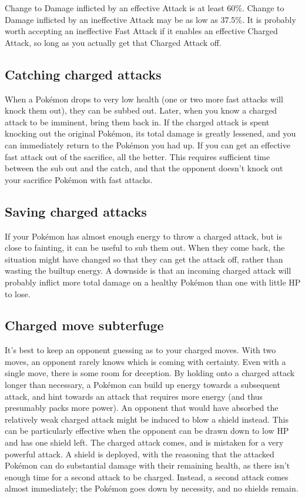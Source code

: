 Change to Damage inflicted by an effective Attack is at least 60\%.
Change to Damage inflicted by an ineffective Attack may be as
 low as 37.5\%.
It is probably worth accepting an ineffective Fast Attack if it
 enables an effective Charged Attack, so long as you actually
 get that Charged Attack off.

\subsection{Catching charged attacks}
When a Pokémon drops to very low health (one or two more fast attacks will knock
 them out), they can be subbed out.
Later, when you know a charged attack to be imminent, bring them back in.
If the charged attack is spent knocking out the original Pokémon, its total
 damage is greatly lessened, and you can immediately return to the Pokémon
 you had up.
If you can get an effective fast attack out of the sacrifice, all the better.
This requires sufficient time between the sub out and the catch, and that the
 opponent doesn't knock out your sacrifice Pokémon with fast attacks.

\subsection{Saving charged attacks}
If your Pokémon has almost enough energy to throw a charged attack, but is close to fainting, it can be useful to sub them out.
When they come back, the situation might have changed so that they can get the attack off,
 rather than wasting the builtup energy.
A downside is that an incoming charged attack will probably inflict more total
 damage on a healthy Pokémon than one with little HP to lose.

\subsection{Charged move subterfuge}
It's best to keep an opponent guessing as to your charged moves.
With two moves, an opponent rarely knows which is coming with certainty.
Even with a single move, there is some room for deception.
By holding onto a charged attack longer than necessary, a Pokémon can build
  up energy towards a subsequent attack, and hint towards an attack
  that requires more energy (and thus presumably packs more power).
An opponent that would have absorbed the relatively weak charged attack
  might be induced to blow a shield instead.
This can be particularly effective when the opponent can be drawn down to low HP
  and has one shield left.
The charged attack comes, and is mistaken for a very powerful attack.
A shield is deployed, with the reasoning that the attacked Pokémon can
  do substantial damage with their remaining health, as there isn't
  enough time for a second attack to be charged.
Instead, a second attack comes almost immediately; the Pokémon goes
  down by necessity, and no shields remain.

